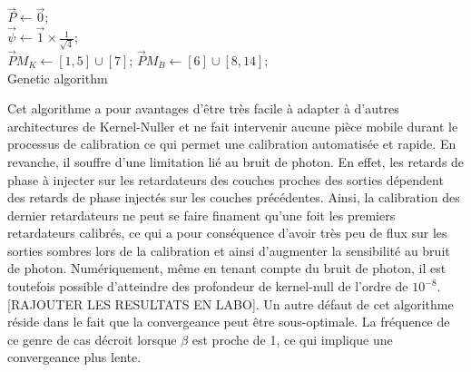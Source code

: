 \documentclass{aa}
\begin{document}
            \begin{algorithm}
            \Input{$\epsilon, \beta$}
            \BlankLine
            \BlankLine
            
            $\vec P \leftarrow \vec 0$;\\
            $\vec \psi \leftarrow \vec 1 \times \frac{1}{\sqrt{4}}$;\\
            $\vec PM_K \leftarrow [1,5] \cup [7]$; $\vec PM_B \leftarrow [6] \cup [8,14]$;\\
            
            \caption{Genetic algorithm}
            \label{genetic}
            \end{algorithm}
            \DecMargin{1em}

            Cet algorithme a pour avantages d'être très facile à adapter à d'autres architectures de Kernel-Nuller et ne fait intervenir aucune pièce mobile durant le processus de calibration ce qui permet une calibration automatisée et rapide. En revanche, il souffre d'une limitation lié au bruit de photon. En effet, les retards de phase à injecter sur les retardateurs des couches proches des sorties dépendent des retards de phase injectés sur les couches précédentes. Ainsi, la calibration des dernier retardateurs ne peut se faire finament qu'une foit les premiers retardateurs calibrés, ce qui a pour conséquence d'avoir très peu de flux sur les sorties sombres lors de la calibration et ainsi d'augmenter la sensibilité au bruit de photon. Numériquement, même en tenant compte du bruit de photon, il est toutefois possible d'atteindre des profondeur de kernel-null de l'ordre de $10^{-8}$. [RAJOUTER LES RESULTATS EN LABO]. Un autre défaut de cet algorithme réside dans le fait que la convergeance peut être sous-optimale. La fréquence de ce genre de cas décroit lorsque $\beta$ est proche de 1, ce qui implique une convergeance plus lente.
\end{document}
